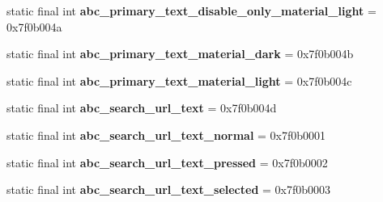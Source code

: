 \begin{DoxyCompactItemize}
\item 
\hypertarget{classandroid_1_1support_1_1v7_1_1appcompat_1_1_r_1_1color_ae55f978b765ded0cbc6f78dc9dee6a64}{}static final int {\bfseries abc\+\_\+primary\+\_\+text\+\_\+disable\+\_\+only\+\_\+material\+\_\+light} = 0x7f0b004a\label{classandroid_1_1support_1_1v7_1_1appcompat_1_1_r_1_1color_ae55f978b765ded0cbc6f78dc9dee6a64}

\item 
\hypertarget{classandroid_1_1support_1_1v7_1_1appcompat_1_1_r_1_1color_a193ef988219ec3ddd1400b083af6cd0b}{}static final int {\bfseries abc\+\_\+primary\+\_\+text\+\_\+material\+\_\+dark} = 0x7f0b004b\label{classandroid_1_1support_1_1v7_1_1appcompat_1_1_r_1_1color_a193ef988219ec3ddd1400b083af6cd0b}

\item 
\hypertarget{classandroid_1_1support_1_1v7_1_1appcompat_1_1_r_1_1color_ab19ada3f12d74579ea080cb9e31de47b}{}static final int {\bfseries abc\+\_\+primary\+\_\+text\+\_\+material\+\_\+light} = 0x7f0b004c\label{classandroid_1_1support_1_1v7_1_1appcompat_1_1_r_1_1color_ab19ada3f12d74579ea080cb9e31de47b}

\item 
\hypertarget{classandroid_1_1support_1_1v7_1_1appcompat_1_1_r_1_1color_aafcbdc372e4268db560611af4a29c59d}{}static final int {\bfseries abc\+\_\+search\+\_\+url\+\_\+text} = 0x7f0b004d\label{classandroid_1_1support_1_1v7_1_1appcompat_1_1_r_1_1color_aafcbdc372e4268db560611af4a29c59d}

\item 
\hypertarget{classandroid_1_1support_1_1v7_1_1appcompat_1_1_r_1_1color_a8e9544b0b882fba58fd27f4b163c56e4}{}static final int {\bfseries abc\+\_\+search\+\_\+url\+\_\+text\+\_\+normal} = 0x7f0b0001\label{classandroid_1_1support_1_1v7_1_1appcompat_1_1_r_1_1color_a8e9544b0b882fba58fd27f4b163c56e4}

\item 
\hypertarget{classandroid_1_1support_1_1v7_1_1appcompat_1_1_r_1_1color_a0c81f78fc9964e70dede96585f496873}{}static final int {\bfseries abc\+\_\+search\+\_\+url\+\_\+text\+\_\+pressed} = 0x7f0b0002\label{classandroid_1_1support_1_1v7_1_1appcompat_1_1_r_1_1color_a0c81f78fc9964e70dede96585f496873}

\item 
\hypertarget{classandroid_1_1support_1_1v7_1_1appcompat_1_1_r_1_1color_a8dce2fc1fae4b2f9a06a854427569289}{}static final int {\bfseries abc\+\_\+search\+\_\+url\+\_\+text\+\_\+selected} = 0x7f0b0003\label{classandroid_1_1support_1_1v7_1_1appcompat_1_1_r_1_1color_a8dce2fc1fae4b2f9a06a854427569289}


\end{DoxyCompactItemize}
